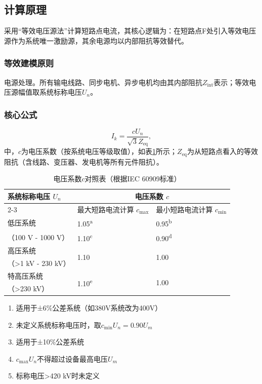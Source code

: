 \documentclass[a4paper,11pt,AutoFakeBold]{ctexart}
\begin{document}
\subsection{计算原理}
采用“等效电压源法”计算短路点电流，其核心逻辑为：在短路点F处引入等效电压源作为系统唯一激励源，其余电源均以内部阻抗等效替代。

\subsubsection{等效建模原则}
电源处理。所有输电线路、同步电机、异步电机均由其内部阻抗$Z_{\text{int}}$表示；等效电压源幅值取系统标称电压$U_{n}$。

\subsubsection{核心公式}
\begin{equation}
    I_{k} = \frac{cU_{n}}{\sqrt{3} Z_{\text{eq}}},
\end{equation}
中，$c$为电压系数（按系统电压等级取值），如表\ref{tab:voltage_factor}所示；$Z_{\text{eq}}$为从短路点看入的等效阻抗（含线路、变压器、发电机等所有元件阻抗）。

\begin{table}[ht]
\centering
\caption{电压系数$c$对照表（根据IEC 60909标准）}
\label{tab:voltage_factor}
\begin{tabularx}{\textwidth}{lXX}
\toprule
\multirow{2}{*}{系统标称电压 \( U_n \)} & \multicolumn{2}{c}{电压系数 \( c \)} \\
\cmidrule(lr){2-3}
& 最大短路电流计算 \( c_{\text{max}} \) & 最小短路电流计算 \( c_{\text{min}} \) \\
\midrule
低压系统 & 1.05\textsuperscript{a} & 0.95\textsuperscript{b} \\
（100 V - 1000 V） & 1.10\textsuperscript{c} & 0.90\textsuperscript{d} \\
\addlinespace

高压系统 & \multirow{2}{*}{1.10} & \multirow{2}{*}{1.00} \\
（>1 kV - 230 kV） & & \\
\addlinespace

特高压系统 & \multirow{2}{*}{1.10\textsuperscript{e}} & \multirow{2}{*}{1.00} \\
（>230 kV） & & \\
\bottomrule
\end{tabularx}

\vspace{0.5em}
\begin{minipage}{\textwidth}
\footnotesize
\begin{enumerate}[label=\alph*), leftmargin=2em, nosep]
  \item 适用于±6\%公差系统（如380V系统改为400V）
  \item 未定义系统标称电压时，取\( c_{\text{min}}U_n = 0.90U_m \)
  \item 适用于±10\%公差系统
  \item \( c_{\text{max}}U_n \)不得超过设备最高电压\( U_m \)
  \item 标称电压>420 kV时未定义
\end{enumerate}
\end{minipage}
\end{table}
\end{document}
